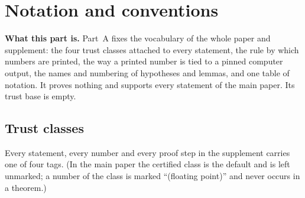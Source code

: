 
\section{Notation and conventions}\label{pA:sec-top}

\noindent\textbf{What this part is.} Part~A fixes the vocabulary of the whole paper and supplement: the four trust classes attached to every statement, the rule by which numbers are printed, the way a printed number is tied to a pinned computer output, the names and numbering of hypotheses and lemmas, and one table of notation. It proves nothing and supports every statement of the main paper. Its trust base is empty.

\subsection{Trust classes}\label{pA:sec-trust}
Every statement, every number and every proof step in the supplement carries one of four tags. (In the main paper the certified class is the default and is left unmarked; a number of the class \test{} is marked ``(floating point)'' and never occurs in a theorem.)


